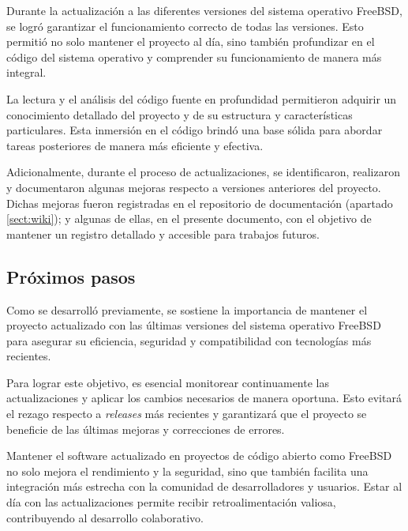 Durante la actualización a las diferentes versiones del sistema operativo FreeBSD, se logró garantizar el funcionamiento correcto de todas las versiones. Esto permitió no solo mantener el proyecto al día, sino también profundizar en el código del sistema operativo y comprender su funcionamiento de manera más integral.\par

La lectura y el análisis del código fuente en profundidad permitieron adquirir un conocimiento detallado del proyecto y de su estructura y características particulares. Esta inmersión en el código brindó una base sólida para abordar tareas posteriores de manera más eficiente y efectiva.\par

Adicionalmente, durante el proceso de actualizaciones, se identificaron, realizaron y documentaron algunas mejoras respecto a versiones anteriores del proyecto. Dichas mejoras fueron registradas en el repositorio de documentación (apartado \ref{sect:wiki}); y algunas de ellas, en el presente documento, con el objetivo de mantener un registro detallado y accesible para trabajos futuros.\par

\subsection{Próximos pasos}

Como se desarrolló previamente, se sostiene la importancia de mantener el proyecto actualizado con las últimas versiones del sistema operativo FreeBSD para asegurar su eficiencia, seguridad y compatibilidad con tecnologías más recientes.\par

Para lograr este objetivo, es esencial monitorear continuamente las actualizaciones y aplicar los cambios necesarios de manera oportuna. Esto evitará el rezago respecto a \textit{releases} más recientes y garantizará que el proyecto se beneficie de las últimas mejoras y correcciones de errores.\par

Mantener el software actualizado en proyectos de código abierto como FreeBSD no solo mejora el rendimiento y la seguridad, sino que también facilita una integración más estrecha con la comunidad de desarrolladores y usuarios. Estar al día con las actualizaciones permite recibir retroalimentación valiosa, contribuyendo al desarrollo colaborativo.\par

